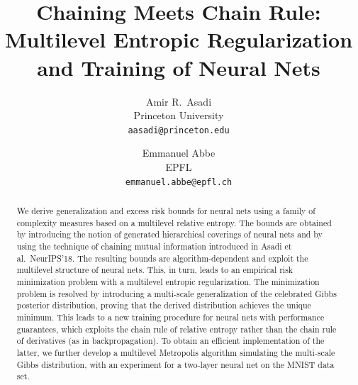 \documentclass{article}
\title{Chaining Meets Chain Rule:\\
Multilevel Entropic Regularization and Training of Neural Nets}
\author{
  Amir R.~Asadi \\
  Princeton University\\
  \texttt{aasadi@princeton.edu} \\
   \and
   Emmanuel Abbe \\
   EPFL \\
   \texttt{emmanuel.abbe@epfl.ch} \\
}
\begin{document}
\maketitle

\begin{abstract}
We derive generalization and excess risk bounds for neural nets using a family of complexity measures based on a multilevel relative entropy. The bounds are obtained by introducing the notion of generated hierarchical coverings of neural nets and by using the technique of chaining mutual information introduced in Asadi et al.\ NeurIPS'18. The resulting bounds are algorithm-dependent and exploit the multilevel structure of neural nets. This, in turn, leads to an empirical risk minimization problem with a multilevel entropic regularization. The minimization problem is resolved by introducing a multi-scale generalization of the celebrated Gibbs posterior distribution, proving that the derived distribution achieves the unique minimum. This leads to a new training procedure for neural nets with performance guarantees, which exploits the chain rule of relative entropy rather than the chain rule of derivatives (as in backpropagation). To obtain an efficient implementation of the latter, we further develop a multilevel Metropolis algorithm simulating the multi-scale Gibbs distribution, with an experiment for a two-layer neural net on the MNIST data set. 
\end{abstract}
\end{document}
